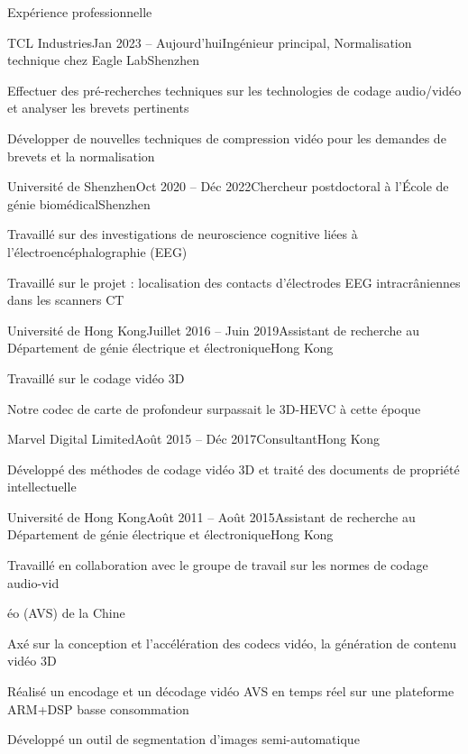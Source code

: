 \documentclass{resume} %
\begin{document}
\begin{rSection}{Expérience professionnelle}
	\begin{rSubsection}{TCL Industries}{Jan 2023 -- Aujourd'hui}{Ingénieur principal, Normalisation technique chez Eagle Lab}{Shenzhen}
		\item Effectuer des pré-recherches techniques sur les technologies de codage audio/vidéo et analyser les brevets pertinents
		\item Développer de nouvelles techniques de compression vidéo pour les demandes de brevets et la normalisation
	\end{rSubsection}
	
	\begin{rSubsection}{Université de Shenzhen}{Oct 2020 -- Déc 2022}{Chercheur postdoctoral à l'École de génie biomédical}{Shenzhen}
		\item Travaillé sur des investigations de neuroscience cognitive liées à l'électroencéphalographie (EEG)
		\item Travaillé sur le projet : localisation des contacts d'électrodes EEG intracrâniennes dans les scanners CT
	\end{rSubsection}
	
	\begin{rSubsection}{Université de Hong Kong}{Juillet 2016 -- Juin 2019}{Assistant de recherche au Département de génie électrique et électronique}{Hong Kong}
		\item Travaillé sur le codage vidéo 3D
		\item Notre codec de carte de profondeur surpassait le 3D-HEVC à cette époque
	\end{rSubsection}
	
	\begin{rSubsection}{Marvel Digital Limited}{Août 2015 -- Déc 2017}{Consultant}{Hong Kong}
		\item Développé des méthodes de codage vidéo 3D et traité des documents de propriété intellectuelle 
	\end{rSubsection}
	
	\begin{rSubsection}{Université de Hong Kong}{Août 2011 -- Août 2015}{Assistant de recherche au Département de génie électrique et électronique}{Hong Kong}
		\item Travaillé en collaboration avec le groupe de travail sur les normes de codage audio-vid

éo (AVS) de la Chine
		\item Axé sur la conception et l'accélération des codecs vidéo, la génération de contenu vidéo 3D
		\item Réalisé un encodage et un décodage vidéo AVS en temps réel sur une plateforme ARM+DSP basse consommation
		\item Développé un outil de segmentation d'images semi-automatique
	\end{rSubsection}
	

\end{rSection}
\end{document}
